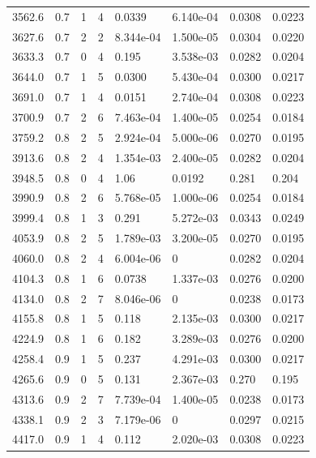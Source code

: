 \documentclass[preview]{standalone}
\begin{document}
{{{{\begin{tabular}{L{1.2cm}C{1.2cm} C{0.3cm}C{0.5cm} C{1.4cm}C{1.4cm} C{1.4cm}C{1.4cm}}
  3562.6  &   0.7  & 1     &  4 &  0.0339  & 6.140e-04  & 0.0308 &  0.0223   \\ 
  3627.6  &   0.7  & 2     &  2 &  8.344e-04  & 1.500e-05  & 0.0304 &  0.0220   \\ 
  3633.3  &   0.7  & 0     &  4 &  0.195  & 3.538e-03  & 0.0282 &  0.0204   \\ 
  3644.0  &   0.7  & 1     &  5 &  0.0300  & 5.430e-04  & 0.0300 &  0.0217   \\ 
  3691.0  &   0.7  & 1     &  4 &  0.0151  & 2.740e-04  & 0.0308 &  0.0223   \\ 
  3700.9  &   0.7  & 2     &  6 &  7.463e-04  & 1.400e-05  & 0.0254 &  0.0184   \\ 
  3759.2  &   0.8  & 2     &  5 &  2.924e-04  & 5.000e-06  & 0.0270 &  0.0195   \\ 
  3913.6  &   0.8  & 2     &  4 &  1.354e-03  & 2.400e-05  & 0.0282 &  0.0204   \\ 
  3948.5  &   0.8  & 0     &  4 &  1.06  & 0.0192  & 0.281 &  0.204   \\ 
  3990.9  &   0.8  & 2     &  6 &  5.768e-05  & 1.000e-06  & 0.0254 &  0.0184   \\ 
  3999.4  &   0.8  & 1     &  3 &  0.291  & 5.272e-03  & 0.0343 &  0.0249   \\ 
  4053.9  &   0.8  & 2     &  5 &  1.789e-03  & 3.200e-05  & 0.0270 &  0.0195   \\ 
  4060.0  &   0.8  & 2     &  4 &  6.004e-06  & 0  & 0.0282 &  0.0204   \\ 
  4104.3  &   0.8  & 1     &  6 &  0.0738  & 1.337e-03  & 0.0276 &  0.0200   \\ 
  4134.0  &   0.8  & 2     &  7 &  8.046e-06  & 0  & 0.0238 &  0.0173   \\ 
  4155.8  &   0.8  & 1     &  5 &  0.118  & 2.135e-03  & 0.0300 &  0.0217   \\ 
  4224.9  &   0.8  & 1     &  6 &  0.182  & 3.289e-03  & 0.0276 &  0.0200   \\ 
  4258.4  &   0.9  & 1     &  5 &  0.237  & 4.291e-03  & 0.0300 &  0.0217   \\ 
  4265.6  &   0.9  & 0     &  5 &  0.131  & 2.367e-03  & 0.270 &  0.195   \\ 
  4313.6  &   0.9  & 2     &  7 &  7.739e-04  & 1.400e-05  & 0.0238 &  0.0173   \\ 
  4338.1  &   0.9  & 2     &  3 &  7.179e-06  & 0  & 0.0297 &  0.0215   \\ 
  4417.0  &   0.9  & 1     &  4 &  0.112  & 2.020e-03  & 0.0308 &  0.0223   \\ 

\end{tabular}}}}}
\end{document}
